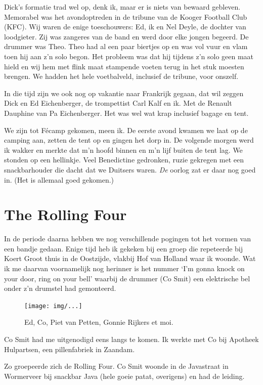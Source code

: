 \documentclass[12pt,twoside]{memoir}
\begin{document}
Dick's formatie trad wel op, denk ik, maar er is niets van bewaard gebleven. Memorabel was het avondoptreden in de tribune van de Kooger Football Club (KFC). Wij waren de enige toeschouwers: Ed, ik en Nel Deyle, de dochter van loodgieter. Zij was zangeres van de band en werd door elke jongen begeerd. De drummer was Theo. Theo had al een paar biertjes op en was vol vuur en vlam toen hij aan z’n solo begon. Het probleem was dat hij tijdens z’n solo geen maat hield en wij hem met flink maat stampende voeten terug in het stuk moesten brengen. We hadden het hele voetbalveld, inclusief de tribune, voor onszelf. 

In die tijd zijn we ook nog op vakantie naar Frankrijk gegaan, dat wil zeggen Dick en Ed Eichenberger, de trompettist Carl Kalf en ik. Met de Renault Dauphine van Pa Eichenberger. Het was wel wat krap inclusief bagage en tent. 

We zijn tot Fécamp gekomen, meen ik. De eerste avond kwamen we laat op de camping aan, zetten de tent op en gingen het dorp in. De volgende morgen werd ik wakker en merkte dat m’n hoofd binnen en m'n lijf buiten de tent lag. We stonden op een hellinkje. Veel Benedictine gedronken, ruzie gekregen met een snackbarhouder die dacht dat we Duitsers waren. \emph{De} oorlog zat er daar nog goed in. (Het is allemaal goed gekomen.)

\chapter{The Rolling Four} %
\label{cha:rollingfour}

In de periode daarna hebben we nog verschillende pogingen tot het vormen van een bandje gedaan. Enige tijd heb ik gekeken bij een groep die repeteerde bij Koert Groot thuis in de Oostzijde, vlakbij Hof van Holland waar ik woonde. Wat ik me daarvan voornamelijk nog herinner is het nummer `I’m gonna knock on your door, ring on your bell' waarbij de drummer (Co Smit) een elektrische bel onder z’n drumstel had gemonteerd.

\begin{figure}[t]
\texttt{[image: img/...]}
\caption{Ed, Co, Piet van Petten, Gonnie Rijkers et moi.}
\end{figure}

Co Smit had me uitgenodigd eens langs te komen. Ik werkte met Co bij Apotheek Hulpartsen, een pillenfabriek in Zaandam.

Zo groepeerde zich de Rolling Four. Co Smit woonde in de Javastraat in Wormerveer bij snackbar Java (hele goeie patat, overigens) en had de leiding.
\end{document}

